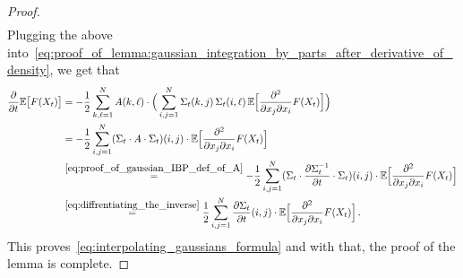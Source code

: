 \documentclass[11pt]{article}
\theoremstyle{definition}
\theoremstyle{remark}
\numberwithin{theorem}{section}
\newcommand{\bE}{\mathbb E}
\begin{document}
\begin{proof}
\begin{align*}
        \end{align*}
        Plugging the above into~\eqref{eq:proof_of_lemma:gaussian_integration_by_parts_after_derivative_of_density}, we get that 
        \begin{align*}
        \frac{\partial}{ \partial t} \bE\big[F(X_t) \big]  &= -  \frac{1}{2} \sum_{k,\ell=1}^{N} A(k,\ell) \cdot \Big( \sum_{i,j=1}^{N} \Sigma_t(k,j) \, \Sigma_t(i,\ell) \, \bE\Big[\frac{\partial^2}{\partial x_j \partial x_i}  F(X_t)  \Big] \Big)  \\ & = -\frac{1}{2} \sum_{i,j=1}^{N}   (\Sigma_t \cdot A \cdot \Sigma_t)(i,j) \cdot \bE\Big[\frac{\partial^2}{\partial x_j \partial x_i}  F(X_t)  \Big] \\  &\stackrel{\eqref{eq:proof_of_gaussian_IBP_def_of_A}}{=}  -\frac{1}{2} \sum_{i,j=1}^{N}   (\Sigma_t \cdot \frac{\partial \Sigma_t^{-1}}{\partial t} \cdot \Sigma_t)(i,j) \cdot \bE\Big[\frac{\partial^2}{\partial x_j \partial x_i}  F(X_t)  \Big] \\ &
         \stackrel{\eqref{eq:diffrentiating_the_inverse}}{=} \frac{1}{2} \sum_{i,j=1}^{N} \frac{\partial\Sigma_t}{\partial t}  (i,j) \cdot \bE\Big[\frac{\partial^2}{\partial x_j \partial x_i}  F(X_t)  \Big] \, .
        \end{align*}
    This proves~\eqref{eq:interpolating_gaussians_formula} and with that, the proof of the lemma is complete.
    \end{proof}
\end{document}
